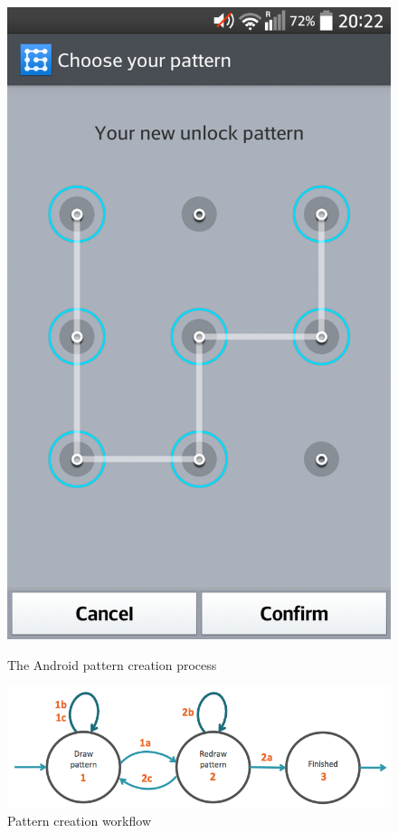 \begin{figure}[H]
{        \includegraphics[scale=0.09]{pics/experiment/patternprocess1.png}
        \label{fig:confirmnewpattern}
      }
      \caption{The Android pattern creation process}
      \label{fig:androidpatterncreationprocess}
    \end{figure}

    \clearpage

    \begin{figure}[H]
      \centering
      \includegraphics[width=\textwidth]{pics/experiment/patterncreationflow.png}
      \caption{Pattern creation workflow}
      \label{fig:patterncreationworkflow}
    \end{figure}

